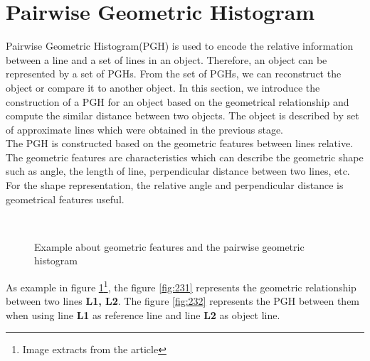 \section{Pairwise Geometric Histogram}
Pairwise Geometric Histogram(PGH)\cite{evans1993use} is used to encode the relative information between a line and a set of lines in an object. Therefore, an object can be represented by a set of PGHs. From the set of PGHs, we can reconstruct the object or compare it to another object. In this section, we introduce the construction of a PGH for an object based on the geometrical relationship and compute the similar distance between two objects. The object is described by set of approximate lines which were obtained in the previous stage.\\
The PGH is constructed based on the geometric features between lines relative. The geometric features are characteristics which can describe the geometric shape such as angle, the length of line, perpendicular distance between two lines, etc. For the shape representation, the relative angle and perpendicular distance is geometrical features useful.\\
\begin{figure}[h!]
\centering
{}~~
\caption{Example about geometric features and the pairwise geometric histogram\cite{palaniswamy2010automatic}}
\label{fig:figure_23}
\end{figure}
As example in figure \ref{fig:figure_23}\footnote{Image extracts from the article}, the figure \ref{fig:231} represents the geometric relationship between two lines \textbf{L1, L2}. The figure \ref{fig:232} represents the PGH between them when using line \textbf{L1} as reference line and line \textbf{L2} as object line.
